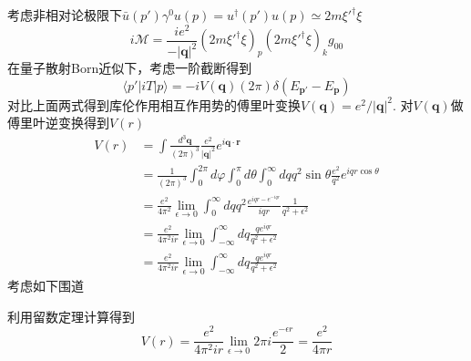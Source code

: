 \documentclass[a4paper]{article}
\begin{document}
考虑非相对论极限下$\bar{u}(p')\gamma^0u(p)=u^\dagger(p')u(p)\simeq 2m\xi'^\dagger \xi$
\begin{equation}
    i\mathcal{M}=\frac{ie^2}{-|\mathbf{q}|^2}(2m\xi'^\dagger\xi)_p(2m\xi'^\dagger\xi)_kg_{00}
\end{equation}
在量子散射Born近似下，考虑一阶截断得到
\begin{equation}
    \langle p'|iT|p\rangle=-iV(\mathbf{q})(2\pi)\delta(E_{\mathbf{p}'}-E_{\mathbf{p}})
\end{equation}
对比上面两式得到库伦作用相互作用势的傅里叶变换$V(\mathbf{q})=e^2/|\mathbf{q}|^2$. 对$V(\mathbf{q})$做傅里叶逆变换得到$V(r)$
\begin{equation}
    \begin{split}
        V(r)&=\int\frac{d^3\mathbf{q}}{(2\pi)^3}\frac{e^2}{|\mathbf{q}|^2}e^{i\mathbf{q}\cdot\mathbf{r}}\\
        &=\frac{1}{(2\pi)^3}\int_{0}^{2\pi}d\varphi\int_0^\pi d\theta\int_0^\infty dq q^2\sin\theta\frac{e^2}{q^2}e^{iqr\cos\theta}\\
        &=\frac{e^2}{4\pi^2}\lim_{\epsilon\to 0}\int_0^\infty dq q^2\frac{e^{iqr-e^{-iqr}}}{iqr}\frac{1}{q^2+\epsilon^2}\\
        &=\frac{e^2}{4\pi^2 ir}\lim_{\epsilon\to 0}\int_{-\infty}^{\infty}dq\frac{qe^{iqr}}{q^2+\epsilon^2}\\
        &=\frac{e^2}{4\pi^2ir}\lim_{\epsilon\to 0}\int_{-\infty}^{\infty}dq\frac{qe^{iqr}}{q^2+\epsilon^2}
    \end{split}
\end{equation}
考虑如下围道
\begin{center}
\end{center}
利用留数定理计算得到
\begin{equation}
    V(r)=\frac{e^2}{4\pi^2ir}\lim_{\epsilon\to0}2\pi i \frac{e^{-\epsilon r}}{2}=\frac{e^2}{4\pi r}
\end{equation}
\end{document}
